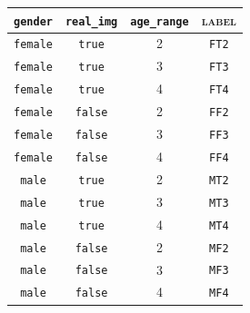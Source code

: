 \begin{center}
	\begin{tabular}{ |c|c|c|c| } 
		\hline 
		\cellcolor[HTML]{b0d7ff} \texttt{gender} & 
		\cellcolor[HTML]{b0d7ff} \texttt{real\_img} & 
		\cellcolor[HTML]{b0d7ff} \texttt{age\_range} &
		\cellcolor[HTML]{b0d7ff} \textsc{label}	\\
		\hline 
		\texttt{female}	&	\texttt{true}	&	\textsc{2}	
		&	\cellcolor[HTML]{e6f2ff} \texttt{FT2}\\	 
		\hline
		\texttt{female}	&	\texttt{true}	&	\textsc{3}	
		&\cellcolor[HTML]{e6f2ff} \texttt{FT3}\\	 
		\hline
		\texttt{female}	&	\texttt{true}	&	\textsc{4}	
		& \cellcolor[HTML]{e6f2ff} \texttt{FT4}\\	 
		\hline
		\texttt{female}	&	\texttt{false}	&	\textsc{2}	
		& \cellcolor[HTML]{e6f2ff} \texttt{FF2}\\	 
		\hline
		\texttt{female}	&	\texttt{false}	&	\textsc{3}	
		& \cellcolor[HTML]{e6f2ff} \texttt{FF3}\\
		\hline
		\texttt{female}	&	\texttt{false}	&	\textsc{4}	
		& \cellcolor[HTML]{e6f2ff} \texttt{FF4}\\
		\hline 	
		\texttt{male}	&	\texttt{true}	&	\textsc{2}	
		& \cellcolor[HTML]{e6f2ff} \texttt{MT2}\\
		\hline
		\texttt{male}	&	\texttt{true}	&	\textsc{3}	
		& \cellcolor[HTML]{e6f2ff} \texttt{MT3}\\	 
		\hline
		\texttt{male}	&	\texttt{true}	&	\textsc{4}	
		& \cellcolor[HTML]{e6f2ff} \texttt{MT4}\\
		\hline
		\texttt{male}	&	\texttt{false}	&	\textsc{2}	
		& \cellcolor[HTML]{e6f2ff} \texttt{MF2}\\
		\hline
		\texttt{male}	&	\texttt{false}	&	\textsc{3}	
		& \cellcolor[HTML]{e6f2ff} \texttt{MF3}\\
		\hline
		\texttt{male}	&	\texttt{false}	&	\textsc{4}	
		& \cellcolor[HTML]{e6f2ff} \texttt{MF4}\\
		\hline 	 	 	 	 	
	\end{tabular}
	\vspace{.3in}
\end{center}
